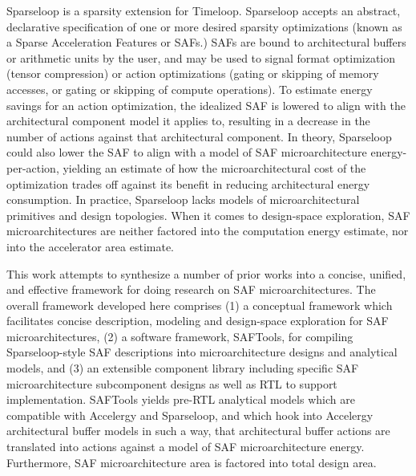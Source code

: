 Sparseloop\cite{sparseloop} is a sparsity extension for Timeloop. Sparseloop accepts an abstract, declarative specification of one or more desired sparsity optimizations (known as a Sparse Acceleration Features or SAFs.) SAFs are bound to architectural buffers or arithmetic units by the user, and may be used to signal format optimization (tensor compression) or action optimizations (gating or skipping of memory accesses, or gating or skipping of compute operations)\cite{sparseloop}. To estimate energy savings for an action optimization, the idealized SAF is lowered to align with the architectural component model it applies to, resulting in a decrease in the number of actions against that architectural component. In theory, Sparseloop could also lower the SAF to align with a model of SAF microarchitecture energy-per-action, yielding an estimate of how the microarchitectural cost of the optimization trades off against its benefit in reducing architectural energy consumption. In practice, Sparseloop lacks models of microarchitectural primitives and design topologies. When it comes to design-space exploration, SAF microarchitectures are neither factored into the computation energy estimate, nor into the accelerator area estimate.

This work attempts to synthesize a number of prior works into a concise, unified, and effective framework for doing research on SAF microarchitectures. The overall framework developed here comprises (1) a conceptual framework which facilitates concise description, modeling and design-space exploration for SAF microarchitectures, (2) a software framework, SAFTools, for compiling Sparseloop-style SAF descriptions into microarchitecture designs and analytical models, and (3) an extensible component library including specific SAF microarchitecture subcomponent designs as well as RTL to support implementation. SAFTools yields pre-RTL analytical models which are compatible with Accelergy and Sparseloop, and which hook into Accelergy architectural buffer models in such a way, that architectural buffer actions are translated into actions against a model of SAF microarchitecture energy. Furthermore, SAF microarchitecture area is factored into total design area. 


